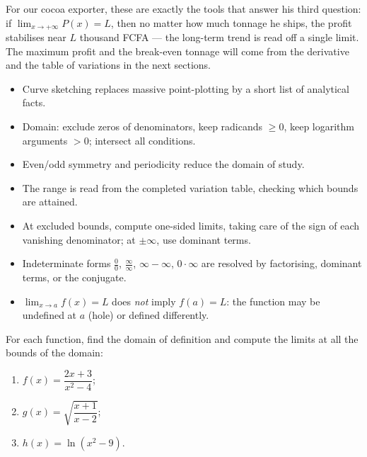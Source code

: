 \documentclass[11pt]{article}
\begin{document}
For our cocoa exporter, these are exactly the tools that answer his third question: if $\lim_{x\to+\infty}P(x)=L$, then no matter how much tonnage he ships, the profit stabilises near $L$ thousand FCFA — the long-term trend is read off a single limit. The maximum profit and the break-even tonnage will come from the derivative and the table of variations in the next sections.

\begin{aretenir}
\begin{itemize}
\item Curve sketching replaces massive point-plotting by a short list of analytical facts.
\item Domain: exclude zeros of denominators, keep radicands $\geq 0$, keep logarithm arguments $>0$; intersect all conditions.
\item Even/odd symmetry and periodicity reduce the domain of study.
\item The range is read from the completed variation table, checking which bounds are attained.
\item At excluded bounds, compute one-sided limits, taking care of the sign of each vanishing denominator; at $\pm\infty$, use dominant terms.
\item Indeterminate forms $\frac{0}{0}$, $\frac{\infty}{\infty}$, $\infty-\infty$, $0\cdot\infty$ are resolved by factorising, dominant terms, or the conjugate.
\item $\lim_{x\to a}f(x)=L$ does \emph{not} imply $f(a)=L$: the function may be undefined at $a$ (hole) or defined differently.
\end{itemize}
\end{aretenir}

\begin{exercice}
For each function, find the domain of definition and compute the limits at all the bounds of the domain:
\begin{enumerate}
\item $f(x)=\dfrac{2x+3}{x^2-4}$;
\item $g(x)=\sqrt{\dfrac{x+1}{x-2}}$;
\item $h(x)=\ln(x^2-9)$.
\end{enumerate}
\end{exercice}
\end{document}
